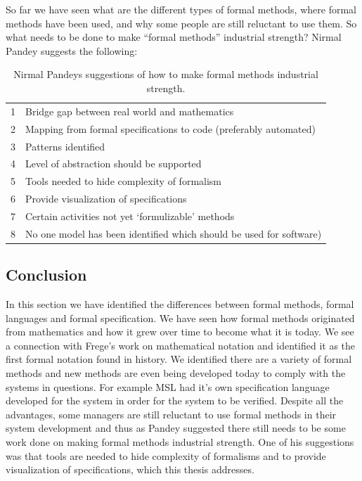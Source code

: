 So far we have seen what are the different types of formal methods, where formal methods have been used, and why some people are still reluctant to use them. So what needs to be done to make “formal methods” industrial strength? Nirmal Pandey \cite{formalmethodslides} suggests the following: 

\begin{table}[H]
\begin{tabular}{|ll|}
\hline
1 & Bridge gap between real world and mathematics \\
2 & Mapping from formal specifications to code (preferably automated) \\
3 &  Patterns identified \\
4 & Level of abstraction should be supported \\
5 &  Tools needed to hide complexity of formalism \\
6 &  Provide visualization of specifications \\
7 & Certain activities not yet ‘formulizable’ methods \\
8 & No one model has been identified which should be used for software) \\
\hline
\end{tabular}
\caption{Nirmal Pandeys suggestions of how to make formal methods industrial strength. \label{tab:nimpand}}
\end{table}



\subsection{Conclusion}

In this section we have identified the differences between formal methods, formal languages and formal specification. We have seen how formal methods originated from mathematics and how it grew over time to become what it is today. We see a connection with Frege's work on mathematical notation and identified it as the first formal notation found in history. We identified there are a variety of formal methods and new methods are even being developed today to comply with the systems in questions. For example MSL had it's own specification language developed for the system in order for the system to be verified. Despite all the advantages, some managers are still reluctant to use formal methods in their system development and thus as Pandey suggested there still needs to be some work done on making formal methods industrial strength. One of his suggestions was that tools are needed to hide complexity of formalisms and to provide visualization of specifications, which this thesis addresses.

